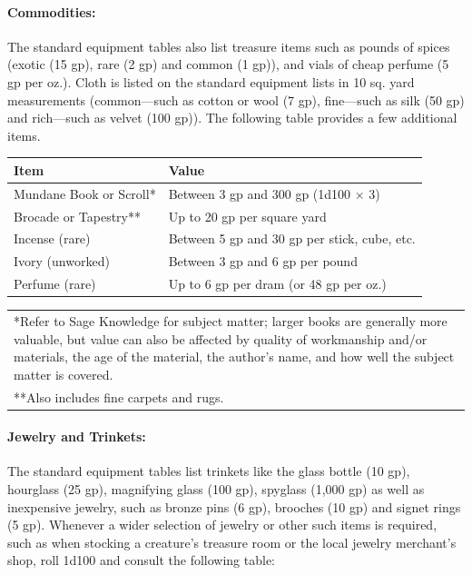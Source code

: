 \begin{multicols}{2}
\begin{minipage}{\columnwidth}
\end{minipage}

\paragraph{Commodities:} The standard equipment tables also list treasure items such as pounds of spices (exotic (15 gp), rare (2 gp) and common (1 gp)), and vials of cheap perfume (5 gp per oz.).  Cloth is listed on the standard equipment lists in 10 sq. yard measurements (common---such as cotton or wool (7 gp), fine---such as silk (50 gp) and rich---such as velvet (100 gp)).  The following table provides a few additional items.

\noindent
\begin{minipage}{\columnwidth}

\label{commodities}
\noindent
\begin{tabular}{|p{}|p{}|}
\hline
Item	& Value \\
\hline\hline
\rowcolor[gray]{.9}Mundane Book or Scroll*	& Between 3 gp and 300 gp (1d100 $\times$ 3) \\
Brocade or Tapestry**	& Up to 20 gp per square yard \\
\rowcolor[gray]{.9}Incense (rare)	& Between 5 gp and 30 gp per stick, cube, etc. \\
Ivory (unworked)	& Between 3 gp and 6 gp per pound \\
\rowcolor[gray]{.9}Perfume (rare)	& Up to 6 gp per dram (or 48 gp per oz.) \\
\hline
\end{tabular}
\noindent\begin{tabular}{p{}}
*Refer to Sage Knowledge for subject matter; larger books are generally more valuable, but value can also be affected by quality of workmanship and/or materials, the age of the material, the author's name, and how well the subject matter is covered. \\
**Also includes fine carpets and rugs. \\
\end{tabular}\vspace{.5em}

\end{minipage}

\paragraph{Jewelry and Trinkets:} The standard equipment tables list trinkets like the glass bottle (10 gp), hourglass (25 gp), magnifying glass (100 gp), spyglass (1,000 gp) as well as inexpensive jewelry, such as bronze pins (6 gp), brooches (10 gp) and signet rings (5 gp).  Whenever a wider selection of jewelry or other such items is required, such as when stocking a creature's treasure room or the local jewelry merchant's shop, roll 1d100 and consult the following table: 


\end{multicols}

